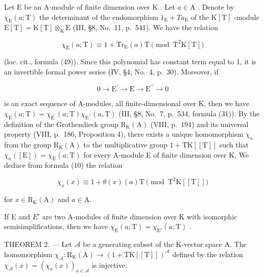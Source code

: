 Let \(\mathrm{E}\) be an A-module of finite dimension over \(\mathrm{K}\) . Let \(a \in \mathrm{A}\) . Denote by \(\chi_{\mathrm{E}}(a; \mathrm{T})\) the determinant of the endomorphism \(1_{\mathrm{E}} + T a_{\mathrm{E}}\) of the \(\mathrm{K}[\mathrm{T}]\) -module \(\mathrm{E}[\mathrm{T}] = \mathrm{K}[\mathrm{T}] \otimes_{\mathrm{K}} \mathrm{E}\) (III, §8, No.~11, p.~541). We have the relation

\[
\chi_ {\mathrm{E}} (a; \mathrm{T}) \equiv 1 + \mathrm{Tr} _ {\mathrm{E}} (a) \mathrm{T} \pmod {\mathrm{T} ^ {2} \mathrm{K} [ \mathrm{T} ]}\tag{10}
\]

(loc. cit., formula (49)). Since this polynomial has constant term equal to 1, it is an invertible formal power series (IV, §4, No.~4, p.~30). Moreover, if

\[
0 \longrightarrow \mathrm{E} ^ {\prime} \longrightarrow \mathrm{E} \longrightarrow \mathrm{E} ^ {\prime \prime} \longrightarrow 0
\]

is an exact sequence of A-modules, all finite-dimensional over K, then we have \(\chi_{\mathrm{E}}(a;\mathrm{T})=\chi_{\mathrm{E}^{\prime}}(a;\mathrm{T})\chi_{\mathrm{E}^{\prime\prime}}(a,\mathrm{T})\) (III, §8, No.~7, p.~534, formula (31)). By the definition of the Grothendieck group \(\mathrm{R}_{\mathrm{K}}(\mathrm{A})\) (VIII, p.~194) and its universal property (VIII, p.~186, Proposition 4), there exists a unique homomorphism \(\chi_{a}\) from the group \(\mathrm{R}_{\mathrm{K}}(\mathrm{A})\) to the multiplicative group \(1+\mathrm{TK}[[\mathrm{T}]]\) such that \(\chi_{a}([\mathrm{E}])=\chi_{\mathrm{E}}(a;\mathrm{T})\) for every A-module E of finite dimension over K. We deduce from formula (10) the relation

\[
\chi_ {a} (x) \equiv 1 + \theta (x) (a) \mathrm{T} \pmod {\mathrm{T} ^ {2} \mathrm{K} [ [ \mathrm{T} ] ]}\tag{11}
\]

for \(x\in \mathrm{R}_{\mathrm{K}}(\mathrm{A})\) and \(a\in \mathrm{A}\).

If E and \(E'\) are two A-modules of finite dimension over K with isomorphic semisimplifications, then we have \(\chi_{\mathrm{E}}(a;\mathrm{T})=\chi_{\mathrm{E}'}(a;\mathrm{T})\) .

THEOREM 2. --- Let \(\mathcal{A}\) be a generating subset of the K-vector space A. The homomorphism \(\chi_{\mathcal{A}}: \mathrm{R}_{\mathrm{K}}(\mathrm{A}) \to (1 + \mathrm{TK}[[\mathrm{T}]])^{\mathcal{A}}\) defined by the relation \(\chi_{\mathcal{A}}(x) = (\chi_a(x))_{a \in \mathcal{A}}\) is injective.

